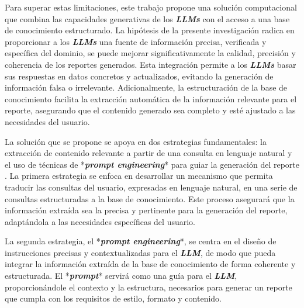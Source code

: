 Para superar estas limitaciones, este trabajo propone una solución computacional que combina las capacidades generativas de los \textit{\textbf{LLMs}} con el acceso a una base de conocimiento estructurado. La hipótesis de la presente investigación radica en proporcionar a los \textit{\textbf{LLMs}} una fuente de información precisa, verificada y específica del dominio, se puede mejorar significativamente la calidad, precisión y coherencia de los reportes generados.
Esta integración permite a los \textit{\textbf{LLMs}} basar sus respuestas en datos concretos y actualizados, evitando la generación de información falsa o irrelevante. Adicionalmente, la estructuración de la base de conocimiento facilita la extracción automática de la información relevante para el reporte, asegurando que el contenido generado sea completo y esté ajustado a las necesidades del usuario.

La solución que se propone se apoya en dos estrategias fundamentales: la extracción de contenido relevante a partir de una consulta en lenguaje natural y el uso de técnicas de *\textit{\textbf{prompt engineering}}* para guiar la generación del reporte \cite{liu2023pre}. La primera estrategia se enfoca en desarrollar un mecanismo que permita traducir las consultas del usuario, expresadas en lenguaje natural, en una serie de consultas estructuradas a la base de conocimiento. Este proceso asegurará que la información extraída sea la precisa y pertinente para la generación del reporte, adaptándola a las necesidades específicas del usuario. 

La segunda estrategia, el *\textit{\textbf{prompt engineering}}*, se centra en el diseño de instrucciones precisas y contextualizadas para el \textit{\textbf{LLM}}, de modo que pueda integrar la información extraída de la base de conocimiento de forma coherente y estructurada. El *\textit{\textbf{prompt}}* servirá como una guía para el \textit{\textbf{LLM}}, proporcionándole el contexto y la estructura, necesarios para generar un reporte que cumpla con los requisitos de estilo, formato y contenido.
